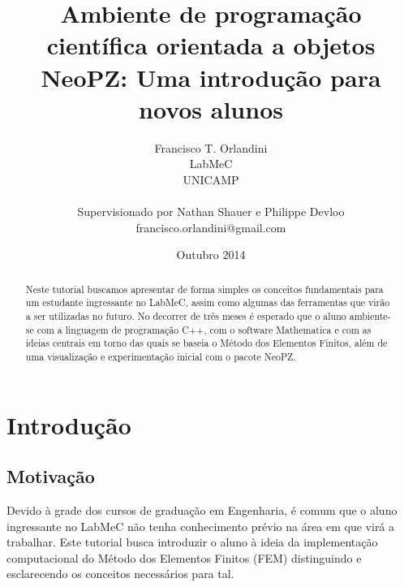 \documentclass[11pt, oneside, hidelinks]{article}   	%
\title{Ambiente de programação científica orientada a objetos NeoPZ: Uma introdução para novos alunos}
\author{Francisco T. Orlandini\\
LabMeC\\
UNICAMP\\
\\
Supervisionado por Nathan Shauer e Philippe Devloo
\\
francisco.orlandini@gmail.com}
\date{Outubro 2014}							%
\begin{document}
\maketitle

\begin{abstract}
Neste tutorial buscamos apresentar de forma simples os conceitos fundamentais para um estudante ingressante no LabMeC, assim como algumas das ferramentas que virão a ser utilizadas no futuro. No decorrer de três meses é esperado que o aluno ambiente-se com a linguagem de programação C++, com o software Mathematica e com as ideias centrais em torno das quais se baseia o Método dos Elementos Finitos, além de uma visualização e experimentação inicial com o pacote NeoPZ.
\end{abstract}
\newpage
\tableofcontents
\newpage

\section{Introdução}
\subsection{Motivação}
Devido à grade dos cursos de graduação em Engenharia, é comum que o aluno ingressante no LabMeC não tenha conhecimento prévio na área em que virá a trabalhar. Este tutorial busca introduzir o aluno à ideia da implementação computacional do Método dos Elementos Finitos (FEM) distinguindo e esclarecendo os conceitos necessários para tal. 
\end{document}
